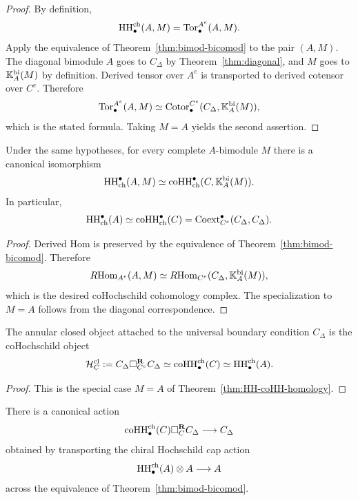 \begin{proof}
By definition,
\[
\operatorname{HH}^{\mathrm{ch}}_\bullet(A,M)=\operatorname{Tor}_\bullet^{A^e}(A,M).
\]
Apply the equivalence of Theorem~\ref{thm:bimod-bicomod} to the pair $(A,M)$.
The diagonal bimodule $A$ goes to $C_\Delta$ by Theorem~\ref{thm:diagonal}, and $M$ goes to
$\mathbb{K}_A^{\mathrm{bi}}(M)$ by definition. Derived tensor over $A^e$ is transported to derived cotensor
over $C^e$. Therefore
\[
\operatorname{Tor}_\bullet^{A^e}(A,M)\simeq \operatorname{Cotor}_\bullet^{C^e}(C_\Delta,\mathbb{K}_A^{\mathrm{bi}}(M)),
\]
which is the stated formula. Taking $M=A$ yields the second assertion.
\end{proof}

\begin{theorem}
\ClaimStatusProvedHere
\label{thm:HH-coHH-cohomology}
Under the same hypotheses, for every complete $A$-bimodule $M$ there is a canonical isomorphism
\[
\operatorname{HH}_{\mathrm{ch}}^\bullet(A,M)\simeq
\operatorname{coHH}_{\mathrm{ch}}^\bullet(C,\mathbb{K}_A^{\mathrm{bi}}(M)).
\]
In particular,
\[
\operatorname{HH}_{\mathrm{ch}}^\bullet(A)\simeq
\operatorname{coHH}_{\mathrm{ch}}^\bullet(C)
=
\operatorname{Coext}_{C^e}^\bullet(C_\Delta,C_\Delta).
\]
\end{theorem}

\begin{proof}
Derived Hom is preserved by the equivalence of Theorem~\ref{thm:bimod-bicomod}. Therefore
\[
R\!\operatorname{Hom}_{A^e}(A,M)\simeq R\!\operatorname{Hom}_{C^e}(C_\Delta,\mathbb{K}_A^{\mathrm{bi}}(M)),
\]
which is the desired coHochschild cohomology complex. The specialization to $M=A$ follows from the
diagonal correspondence.
\end{proof}

\begin{corollary}
\ClaimStatusProvedHere
\label{cor:annulus}
The annular closed object attached to the universal boundary condition $C_\Delta$ is the coHochschild
object
\[
\mathcal H_C^{\mathrm{cl}}
:=
C_\Delta \square_{C^e}^{\mathbf R} C_\Delta
\simeq
\operatorname{coHH}^{\mathrm{ch}}_\bullet(C)
\simeq
\operatorname{HH}^{\mathrm{ch}}_\bullet(A).
\]
\end{corollary}

\begin{proof}
This is the special case $M=A$ of Theorem~\ref{thm:HH-coHH-homology}.
\end{proof}

\begin{corollary}
\ClaimStatusProvedHere
\label{cor:cap}
There is a canonical action
\[
\operatorname{coHH}^{\mathrm{ch}}_\bullet(C)\square_C^{\mathbf R} C_\Delta \longrightarrow C_\Delta
\]
obtained by transporting the chiral Hochschild cap action
\[
\operatorname{HH}^{\mathrm{ch}}_\bullet(A)\otimes A\longrightarrow A
\]
across the equivalence of Theorem~\ref{thm:bimod-bicomod}.
\end{corollary}

